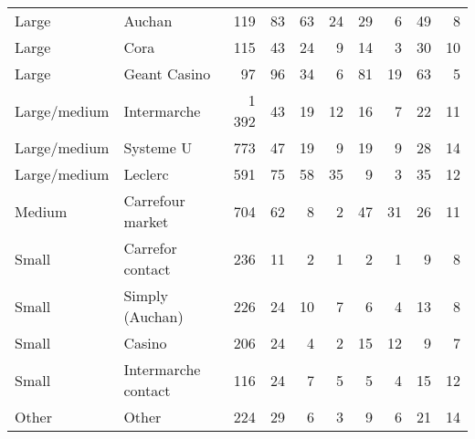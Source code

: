 \documentclass[english]{article}
\begin{document}
\begin{table}[hbtp]
\begin{threeparttable}
\begin{tabular}{llr|r|rr|rr|rr}
    Large & Auchan & 119   & 83    & 63    & 24    & 29    & 6     & 49    & 8 \\
    Large & Cora  & 115   & 43    & 24    & 9     & 14    & 3     & 30    & 10 \\
    Large & Geant Casino & 97    & 96    & 34    & 6     & 81    & 19    & 63    & 5 \\
    Large/medium & Intermarche & 1 392 & 43    & 19    & 12    & 16    & 7     & 22    & 11 \\
    Large/medium & Systeme U & 773   & 47    & 19    & 9     & 19    & 9     & 28    & 14 \\
    Large/medium & Leclerc & 591   & 75    & 58    & 35    & 9     & 3     & 35    & 12 \\
    Medium & Carrefour market & 704   & 62    & 8     & 2     & 47    & 31    & 26    & 11 \\
    Small & Carrefor contact & 236   & 11    & 2     & 1     & 2     & 1     & 9     & 8 \\
    Small & Simply (Auchan) & 226   & 24    & 10    & 7     & 6     & 4     & 13    & 8 \\
    Small & Casino & 206   & 24    & 4     & 2     & 15    & 12    & 9     & 7 \\
    Small & Intermarche contact & 116   & 24    & 7     & 5     & 5     & 4     & 15    & 12 \\
    Other & Other & 224   & 29    & 6     & 3     & 9     & 6     & 21    & 14 \\
    \bottomrule
    \bottomrule
\end{tabular}
\end{threeparttable}
\end{table}
\end{document}
